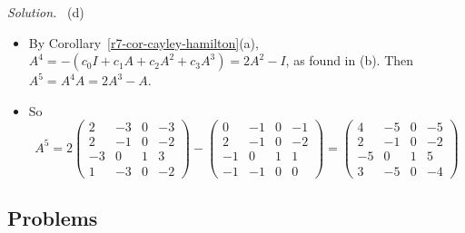 \documentclass[12pt]{article}
\theoremstyle{definition}
\newenvironment{solution}{\par\noindent\textit{Solution.}\ }{\par\smallskip}
\begin{document}
\begin{solution}
(d)
\begin{itemize}
\item By Corollary~\ref{r7-cor-cayley-hamilton}(a), \(A^4=-(c_0I+c_1A+c_2A^2+c_3A^3)=2A^2-I\), as found in (b). Then
\(A^5=A^4A=2A^3-A\).
\item So
\[
A^5=2\begin{pmatrix}2&-3&0&-3\\2&-1&0&-2\\-3&0&1&3\\1&-3&0&-2\end{pmatrix}-\begin{pmatrix}0&-1&0&-1\\2&-1&0&-2\\-1&0&1&1\\-1&-1&0&0\end{pmatrix}
=\begin{pmatrix}4&-5&0&-5\\2&-1&0&-2\\-5&0&1&5\\3&-5&0&-4\end{pmatrix}
\]
\end{itemize}
\end{solution}

\subsection*{Problems}
\end{document}
